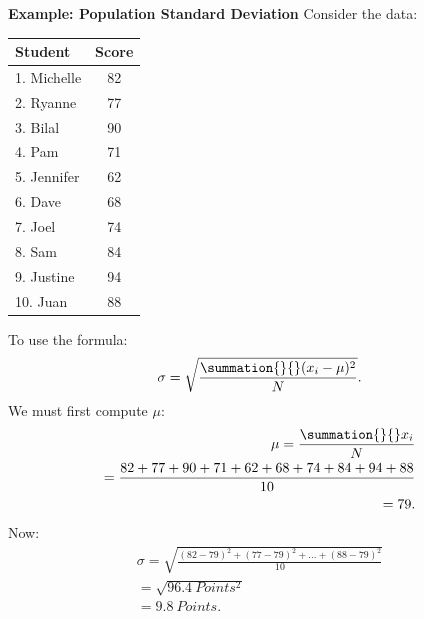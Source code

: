 \documentclass{report}
\begin{document}
        \begin{mdframed}
          \textbf{Example: Population Standard Deviation}
          \bigbreak \noindent 
          Consider the data:
          \bigbreak \noindent 
          \begin{center}
          \begin{tabular}{|l|c|}
              \hline
            \textbf{Student} & \textbf{Score} \\
            \midrule
            1. Michelle & 82 \\
            \hline
            2. Ryanne & 77 \\
            \hline
            3. Bilal & 90 \\
            \hline
            4. Pam & 71 \\
            \hline
            5. Jennifer & 62 \\
            \hline
            6. Dave & 68 \\
            \hline
            7. Joel & 74 \\
            \hline
            8. Sam & 84 \\
            \hline
            9. Justine & 94 \\
            \hline
            10. Juan & 88 \\
            \hline
          \end{tabular}
        \end{center}
        \bigbreak \noindent 
        To use the formula:
        \begin{align*}
            \sigma = \sqrt{\frac{\summation{}{}(x_{i} - \mu)^{2}}{N}}
        .\end{align*}
        \bigbreak \noindent 
        We must first compute $\mu$:
        \begin{align*}
            \mu = \frac{\summation{}{}x_{i}}{N} \\
            = \frac{82 + 77 + 90 + 71 + 62 + 68 + 74 + 84 + 94 + 88}{10} \\
            = 79
        .\end{align*}
        \bigbreak \noindent 
        Now:
        \begin{align*}
            \sigma = \sqrt{\frac{(82-79)^{2}+(77-79)^{2}+...+(88-79)^{2}}{10}} \\
            = \sqrt{96.4\ Points^{2}} \\
            =9.8\ Points
        .\end{align*}
        \end{mdframed}
\end{document}
